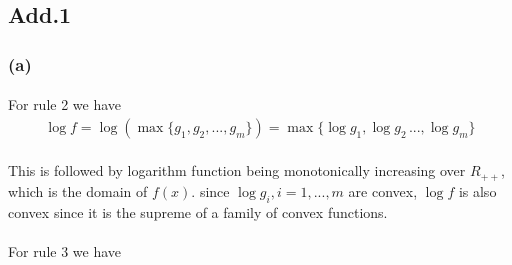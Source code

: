 \subsection*{Add.1}
\subsubsection*{(a)}
\paragraph{}
For rule 2 we have
\begin{align*}
\log f =\log (\max\{g_1, g_2,...,g_m\}) = \max\{\log g_1, \log g_2\,...,\log g_m\}
\end{align*}
\paragraph{}
This is followed by logarithm function being monotonically increasing over $R_{++}$, which is the domain of $f(x)$. since $\log g_i, i=1,...,m$ are convex, $\log f$ is also convex since it is the supreme of a family of convex functions.
\paragraph{}
For rule 3 we have